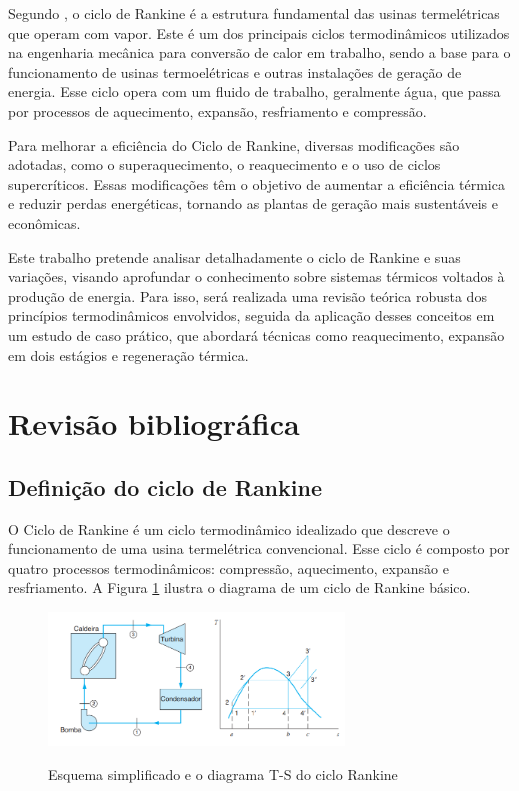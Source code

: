\documentclass[
	article,			%
	11pt,				%
	oneside,			%
	a4paper,			%
	english,			%
	brazil,				%
	sumario=tradicional
	]{abntex2}
\begin{document}
Segundo \cite{moran-2018}, o ciclo de Rankine é a estrutura fundamental das usinas termelétricas que operam com vapor. Este é um dos principais ciclos termodinâmicos utilizados na engenharia mecânica para conversão de calor em trabalho, sendo a base para o funcionamento de usinas termoelétricas e outras instalações de geração de energia. Esse ciclo opera com um fluido de trabalho, geralmente água, que passa por processos de aquecimento, expansão, resfriamento e compressão.

Para melhorar a eficiência do Ciclo de Rankine, diversas modificações são adotadas, como o superaquecimento, o reaquecimento e o uso de ciclos supercríticos. Essas modificações têm o objetivo de aumentar a eficiência térmica e reduzir perdas energéticas, tornando as plantas de geração mais sustentáveis e econômicas.

Este trabalho pretende analisar detalhadamente o ciclo de Rankine e suas variações, visando aprofundar o conhecimento sobre sistemas térmicos voltados à produção de energia. Para isso, será realizada uma revisão teórica robusta dos princípios termodinâmicos envolvidos, seguida da aplicação desses conceitos em um estudo de caso prático, que abordará técnicas como reaquecimento, expansão em dois estágios e regeneração térmica.

\section{Revisão bibliográfica}

\subsection{Definição do ciclo de Rankine}

O Ciclo de Rankine é um ciclo termodinâmico idealizado que descreve o funcionamento de uma usina termelétrica convencional. Esse ciclo é composto por quatro processos termodinâmicos: compressão, aquecimento, expansão e resfriamento. A Figura \ref{fig:esquema-simplificado-ciclo-rankine} ilustra o diagrama de um ciclo de Rankine básico.

\begin{figure}[h]
	\centering
	\includegraphics[width=0.7\textwidth]{./images/Esquema simplificado e o diagrama T-S do ciclo Rankine.png}
	\label{fig:esquema-simplificado-ciclo-rankine}
	\caption{Esquema simplificado e o diagrama T-S do ciclo Rankine}
\end{figure}
\end{document}
